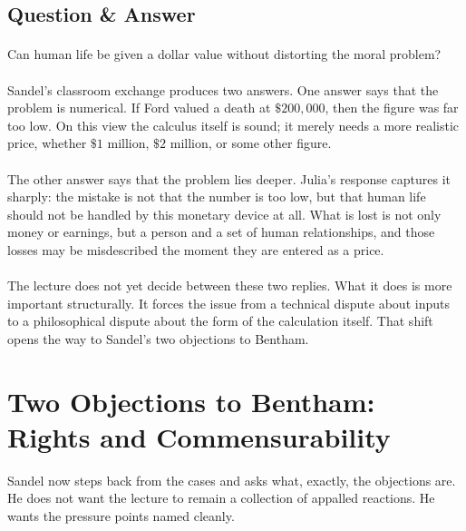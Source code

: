 \subsection{Question \& Answer}

\paragraph{}
Can human life be given a dollar value without distorting the moral problem?

\paragraph{}
Sandel's classroom exchange produces two answers. One answer says that the problem is numerical. If Ford valued a death at \(\$200{,}000\), then the figure was far too low. On this view the calculus itself is sound; it merely needs a more realistic price, whether \(\$1\) million, \(\$2\) million, or some other figure.

\paragraph{}
The other answer says that the problem lies deeper. Julia's response captures it sharply: the mistake is not that the number is too low, but that human life should not be handled by this monetary device at all. What is lost is not only money or earnings, but a person and a set of human relationships, and those losses may be misdescribed the moment they are entered as a price.

\paragraph{}
The lecture does not yet decide between these two replies. What it does is more important structurally. It forces the issue from a technical dispute about inputs to a philosophical dispute about the form of the calculation itself. That shift opens the way to Sandel's two objections to Bentham.

\section{Two Objections to Bentham: Rights and Commensurability}

Sandel now steps back from the cases and asks what, exactly, the objections are. He does not want the lecture to remain a collection of appalled reactions. He wants the pressure points named cleanly.

